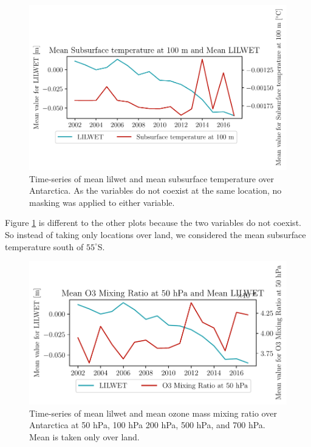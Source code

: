 \documentclass[../main.tex]{subfiles}
\begin{document}
\begin{figure}[hbt!]
    \centering
    \includegraphics{images/2021w5/chapter7/hres/tiemseries_subsurtemp_100_LIC}
    \caption{Time-series of mean \gls{lilwet} and mean subsurface temperature over Antarctica. As the variables do not coexist at the same location, no masking was applied to either variable.}
    \label{fig:timeseries_subsurtemp_100}
\end{figure}

Figure \ref{fig:timeseries_subsurtemp_100} is different to the other plots because the two variables do not coexist. So instead of taking only locations over land, we considered the mean subsurface temperature south of $55^\circ$S. 

\begin{figure}[hbt!]
    \centering
    \includegraphics{images/2021w5/chapter7/hres/tiemseries_o3_50_LIC}
    \caption{Time-series of mean \gls{lilwet} and mean ozone mass mixing ratio over Antarctica at 50 hPa, 100 hPa 200 hPa, 500 hPa, and 700 hPa. Mean is taken only over land.}
    \label{fig:timeseries_o3_50}
\end{figure}
\end{document}

